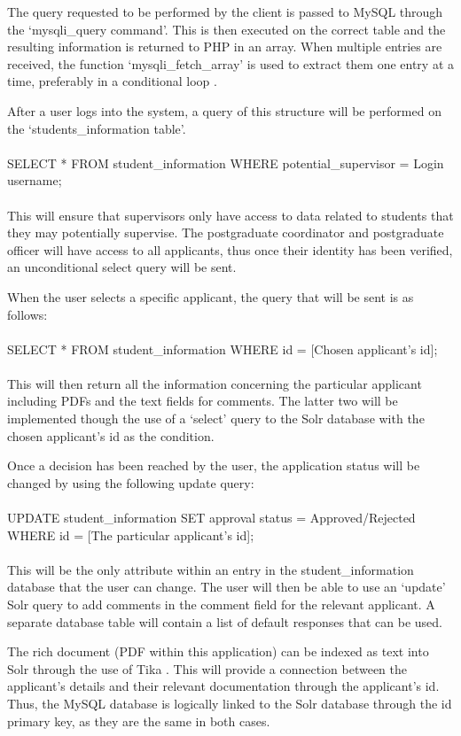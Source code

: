 \documentclass[journal]{IEEEtran}
\begin{document}
\hfill \break The query requested to be performed by the client is passed to MySQL through the `mysqli\_query command'. This is then executed on the correct table and the resulting information is returned to PHP in an array. When multiple entries are received, the function `mysqli\_fetch\_array' is used to extract them one entry at a time, preferably in a conditional loop \cite{phpmysql}.

\hfill \break After a user logs into the system, a query of this structure will be performed on the `students\_information table'. \\\\ SELECT * FROM student\_information WHERE potential\_supervisor = Login username; \\\\ This will ensure that supervisors only have access to data related to students that they may potentially supervise. The postgraduate coordinator and postgraduate officer will have access to all applicants, thus once their identity has been verified, an unconditional select query will be sent.

\hfill \break When the user selects a specific applicant, the query that will be sent is as follows: \\\\ SELECT * FROM student\_information WHERE id = [Chosen applicant's id]; \\\\ This will then return all the information concerning the particular applicant including PDFs and the text fields for comments. The latter two will be implemented though the use of a `select' query to the Solr database with the chosen applicant's id as the condition.

\hfill \break Once a decision has been reached by the user, the application status will be changed by using the following update query: \\\\ UPDATE student\_information SET approval status = Approved/Rejected WHERE id = [The particular applicant's id]; \\\\ This will be the only attribute within an entry in the student\_information database that the user can change. The user will then be able to use an `update' Solr query to add comments in the comment field for the relevant applicant. A separate database table will contain a list of default responses that can be used.

\hfill \break The rich document (PDF within this application) can be indexed as text into Solr through the use of Tika \cite{solrtika}. This will provide a connection between the applicant's details and their relevant documentation through the applicant's id. Thus, the MySQL database is logically linked to the Solr database through the id primary key, as they are the same in both cases.
\end{document}
